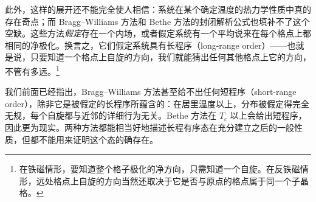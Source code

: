 此外，这样的展开还不能完全使人相信：系统在某个确定温度的热力学性质中真的存在奇点；而 Bragg--Williams 方法和 Bethe 方法的封闭解析公式也填补不了这个空缺。这些方法\emph{假定}存在一个内场，或者假定系统有一个平均说来在每个格点上都相同的净极化。换言之，它们假定系统具有长程序（long-range order）——也就是说，只要知道一个格点上自旋的方向，我们就能猜出任何其他格点上它的方向，不管有多远。\footnote{在铁磁情形，要知道整个格子极化的净方向，只需知道一个自旋。在反铁磁情形，远处格点上自旋的方向当然还取决于它是否与原点的格点属于同一个子晶格。}


我们前面已经指出，Bragg--Williams 方法甚至给不出任何短程序（short-range order），除非它是被假定的长程序所蕴含的：在居里温度以上，分布被假定得完全无规，每个自旋都与近邻的详细行为无关。Bethe 方法在 $T_c$ 以上会给出短程序，因此更为现实。两种方法都能相当好地描述长程有序态在充分建立之后的一般性质，但都不能用来证明这个态的确存在。
